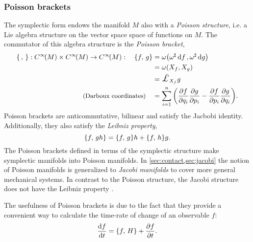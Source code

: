 \subsubsection{Poisson brackets}
The symplectic form endows the manifold \(M\) also with a \emph{Poisson structure}, i.e. a Lie algebra structure on the vector space space of functions on \(M\). The commutator of this algebra structure is the \emph{Poisson bracket},
\begin{equation}
    \begin{split}
        \poisson{\,}{}: \functions{M} \times \functions{M} \to \functions{M}: \quad  
        \poisson{f}{g} &= \omega\qty(\fromDual{\omega}\dd{f}, \fromDual{\omega}\dd{g})  \\
                       &= \omega\qty(X_f, X_g) \\
                       &= \lied{X_f}{g} \\
        \text{\small (Darboux coordinates)} \quad &= \sum_{i = 1}^n \qty(\pdv{f}{q_i}\pdv{g}{p_i} - \pdv{f}{p_i}\pdv{g}{q_i}).
    \end{split}
\end{equation}
Poisson brackets are anticommutative, bilinear and satisfy the Jacbobi identity. Additionally, they also satisfy the \emph{Leibniz property}, 
\begin{equation}
     \qty{f,\,gh} = \qty{f,\,g} h + \qty{f,\,h} g.
\end{equation}
The Poisson brackets defined in terms of the symplectic structure make symplectic manifolds into Poisson manifolds. In \cref{sec:contact,sec:jacobi} the notion of Poisson manifolds is generalized to \emph{Jacobi manifolds} to cover more general mechanical systems. In contrast to the Poisson structure, the Jacobi structure does not have the Leibniz property \cite{Arnold1989,Libermann1987}.

The usefulness of Poisson brackets is due to the fact that they provide a convenient way to calculate the time-rate of change of an observable \(f\): 
\begin{equation}
     \dv{f}{t} = \qty{f,\,H} + \pdv{f}{t}.
\end{equation}


